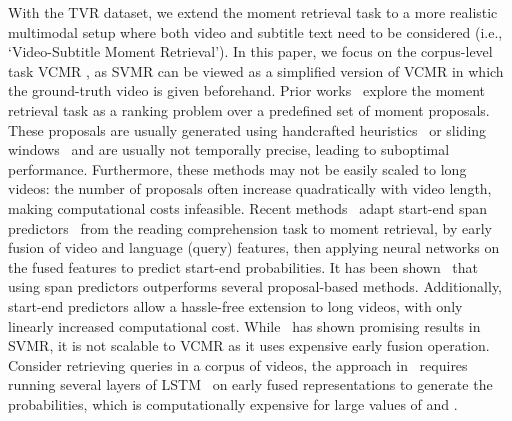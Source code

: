 \documentclass[runningheads]{llncs}
\begin{document}
With the TVR dataset, we extend the moment retrieval task to a more realistic multimodal setup where both video and subtitle text need to be considered (i.e., `Video-Subtitle Moment Retrieval'). In this paper, we focus on the corpus-level task VCMR 
, as SVMR can be viewed as a simplified version of VCMR in which the ground-truth video is given beforehand. 
Prior works~\cite{anne2017localizing,gao2017tall,hendricks2018localizing,xu2019multilevel,ge2019mac,escorcia2019temporal} explore the moment retrieval task as a ranking problem over a predefined set of moment proposals. These proposals are usually generated using handcrafted heuristics~\cite{anne2017localizing,hendricks2018localizing} or sliding windows~\cite{gao2017tall,xu2019multilevel,ge2019mac,escorcia2019temporal} and are usually not temporally precise, leading to suboptimal performance. 
Furthermore, these methods may not be easily scaled to long videos: the number of proposals often increase quadratically with video length, making computational costs infeasible. 
Recent methods~\cite{ghosh2019excl,lei2019tvqa+} adapt start-end span predictors~\cite{seo2016bidirectional,chen2017reading} from the reading comprehension task to moment retrieval, by early fusion of video and language (query) features, then applying neural networks on the fused features to predict start-end probabilities. 
It has been shown~\cite{ghosh2019excl} that using span predictors outperforms several proposal-based methods. 
Additionally, start-end predictors allow a hassle-free extension to long videos, with only linearly increased computational cost. 
While~\cite{ghosh2019excl} has shown promising results in SVMR, it is not scalable to VCMR as it uses expensive early fusion operation. 
Consider retrieving  queries in a corpus of  videos, the approach in~\cite{ghosh2019excl} requires running several layers of LSTM~\cite{hochreiter1997long} on \cdot early fused representations to generate the probabilities, which is computationally expensive for large values of  and . 
\end{document}
